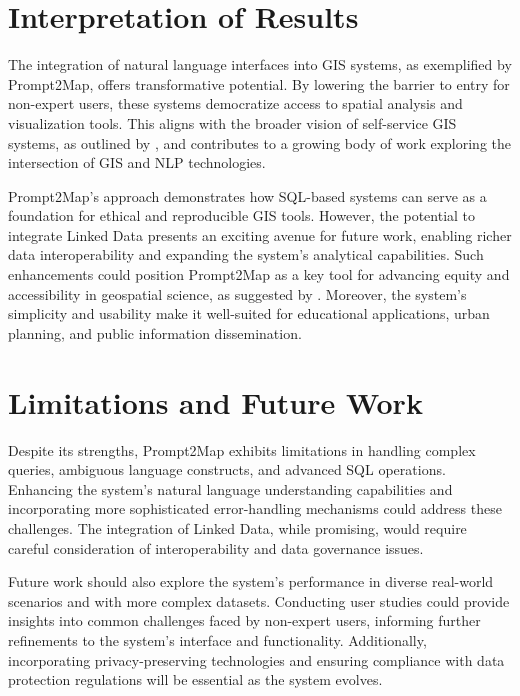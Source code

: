 \section{Interpretation of Results}

The integration of natural language interfaces into GIS systems, as exemplified by Prompt2Map, offers transformative potential. By lowering the barrier to entry for non-expert users, these systems democratize access to spatial analysis and visualization tools. This aligns with the broader vision of self-service GIS systems, as outlined by \citep{rowland_towards_2020}, and contributes to a growing body of work exploring the intersection of GIS and NLP technologies.

Prompt2Map's approach demonstrates how SQL-based systems can serve as a foundation for ethical and reproducible GIS tools. However, the potential to integrate Linked Data presents an exciting avenue for future work, enabling richer data interoperability and expanding the system's analytical capabilities. Such enhancements could position Prompt2Map as a key tool for advancing equity and accessibility in geospatial science, as suggested by \citep{wang_gpt_2024}. Moreover, the system's simplicity and usability make it well-suited for educational applications, urban planning, and public information dissemination.  

\section{Limitations and Future Work}

Despite its strengths, Prompt2Map exhibits limitations in handling complex queries, ambiguous language constructs, and advanced SQL operations. Enhancing the system's natural language understanding capabilities and incorporating more sophisticated error-handling mechanisms could address these challenges. The integration of Linked Data, while promising, would require careful consideration of interoperability and data governance issues.

Future work should also explore the system's performance in diverse real-world scenarios and with more complex datasets. Conducting user studies could provide insights into common challenges faced by non-expert users, informing further refinements to the system's interface and functionality. Additionally, incorporating privacy-preserving technologies and ensuring compliance with data protection regulations will be essential as the system evolves.
